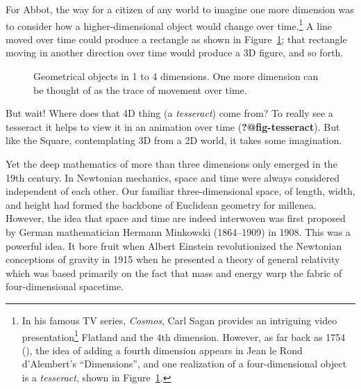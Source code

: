 \documentclass[
  letterpaper,
  10pt,
  krantz2]{krantz}
\providecommand{\href}[2]{#2\footnote{\url{#1}}}
\begin{document}
For Abbot, the way for a citizen of any world to imagine one more
dimension was to consider how a higher-dimensional object would change
over time.\footnote{In his famous TV series, \emph{Cosmos}, Carl Sagan
  provides \href{https://youtu.be/UnURElCzGc0}{an intriguing video
  presentation} Flatland and the 4th dimension. However, as far back as
  1754 (), the idea of adding a
  fourth dimension appears in Jean le Rond d'Alembert's ``Dimensions'',
  and one realization of a four-dimensional object is a
  \emph{tesseract}, shown in Figure~\ref{fig-1D-4D}.} A line moved over
time could produce a rectangle as shown in Figure~\ref{fig-1D-4D}; that
rectangle moving in another direction over time would produce a 3D
figure, and so forth.

\begin{figure}


\caption{\label{fig-1D-4D}Geometrical objects in 1 to 4 dimensions. One
more dimension can be thought of as the trace of movement over time.}

\end{figure}%

But wait! Where does that 4D thing (a \emph{tesseract}) come from? To
really see a tesseract it helps to view it in an animation over time
(\textbf{?@fig-tesseract}). But like the Square, contemplating 3D from a
2D world, it takes some imagination.

Yet the deep mathematics of more than three dimensions only emerged in
the 19th century. In Newtonian mechanics, space and time were always
considered independent of each other. Our familiar three-dimensional
space, of length, width, and height had formed the backbone of Euclidean
geometry for millenea. However, the idea that space and time are indeed
interwoven was first proposed by German mathematician Hermann Minkowski
(1864--1909) in 1908. This was a powerful idea. It bore fruit when
Albert Einstein revolutionized the Newtonian conceptions of gravity in
1915 when he presented a theory of general relativity which was based
primarily on the fact that mass and energy warp the fabric of
four-dimensional spacetime.
\end{document}
